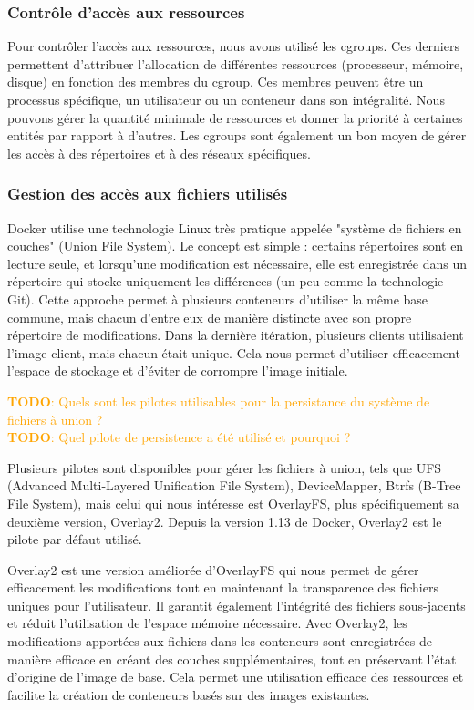\documentclass[a11paper, 11pt]{article}
\newcommand{\todo}[1]{\textcolor{orange}{\textbf{TODO}: #1}}
\begin{document}
\subsubsection{Contrôle d'accès aux ressources}

Pour contrôler l'accès aux ressources, nous avons utilisé les cgroups. Ces derniers permettent d'attribuer l'allocation de différentes ressources (processeur, mémoire, disque) en fonction des membres du cgroup. Ces membres peuvent être un processus spécifique, un utilisateur ou un conteneur dans son intégralité. Nous pouvons gérer la quantité minimale de ressources et donner la priorité à certaines entités par rapport à d'autres. Les cgroups sont également un bon moyen de gérer les accès à des répertoires et à des réseaux spécifiques.

\subsubsection{Gestion des accès aux fichiers utilisés}


Docker utilise une technologie Linux très pratique appelée "système de fichiers en couches" (Union File System). Le concept est simple : certains répertoires sont en lecture seule, et lorsqu'une modification est nécessaire, elle est enregistrée dans un répertoire qui stocke uniquement les différences (un peu comme la technologie Git). Cette approche permet à plusieurs conteneurs d'utiliser la même base commune, mais chacun d'entre eux de manière distincte avec son propre répertoire de modifications. Dans la dernière itération, plusieurs clients utilisaient l'image client, mais chacun était unique. Cela nous permet d'utiliser efficacement l'espace de stockage et d'éviter de corrompre l'image initiale.


\todo{Quels sont les pilotes utilisables pour la persistance du système de fichiers
à union ?} \\
\todo{Quel pilote de persistence a été utilisé et pourquoi ?}

Plusieurs pilotes sont disponibles pour gérer les fichiers à union, tels que UFS (Advanced Multi-Layered Unification File System), DeviceMapper, Btrfs (B-Tree File System), mais celui qui nous intéresse est OverlayFS, plus spécifiquement sa deuxième version, Overlay2. Depuis la version 1.13 de Docker, Overlay2 est le pilote par défaut utilisé.

Overlay2 est une version améliorée d'OverlayFS qui nous permet de gérer efficacement les modifications tout en maintenant la transparence des fichiers uniques pour l'utilisateur. Il garantit également l'intégrité des fichiers sous-jacents et réduit l'utilisation de l'espace mémoire nécessaire. Avec Overlay2, les modifications apportées aux fichiers dans les conteneurs sont enregistrées de manière efficace en créant des couches supplémentaires, tout en préservant l'état d'origine de l'image de base. Cela permet une utilisation efficace des ressources et facilite la création de conteneurs basés sur des images existantes.
\end{document}
